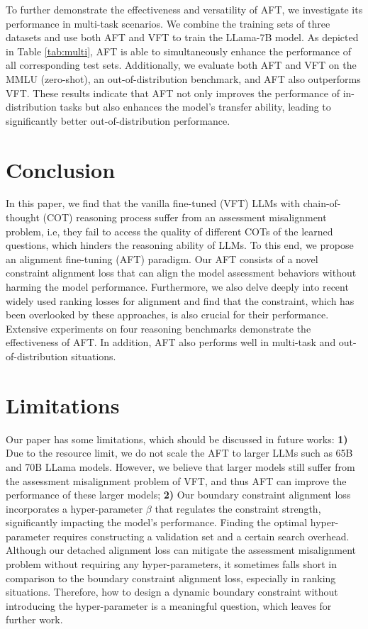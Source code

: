 To further demonstrate the effectiveness and versatility of AFT, we investigate its performance in multi-task scenarios. We combine the training sets of three datasets and use both AFT and VFT to train the LLama-7B model. As depicted in Table \ref{tab:multi}, AFT is able to simultaneously enhance the performance of all corresponding test sets. Additionally, we evaluate both AFT and VFT on the MMLU (zero-shot), an out-of-distribution benchmark, and AFT also outperforms VFT. These results indicate that AFT not only improves the performance of in-distribution tasks but also enhances the model's transfer ability, leading to significantly better out-of-distribution performance.

\section{Conclusion}
In this paper, we find that the vanilla fine-tuned (VFT) LLMs with chain-of-thought (COT) reasoning process suffer from an assessment misalignment problem, i.e, they fail to access the quality of different COTs of the learned questions, which hinders the reasoning ability of LLMs. To this end, we propose an alignment fine-tuning (AFT) paradigm. Our AFT consists of a novel constraint alignment loss that can align the model assessment behaviors without harming the model performance. Furthermore, we also delve deeply into recent widely used ranking losses for alignment and find that the constraint, which has been overlooked by these approaches, is also crucial for their performance. Extensive experiments on four reasoning benchmarks demonstrate the effectiveness of AFT. In addition, AFT also performs well in multi-task and out-of-distribution situations.

\section{Limitations}
Our paper has some limitations, which should be discussed in future works:
\textbf{1)} Due to the resource limit, we do not scale the AFT to larger LLMs such as 65B and 70B LLama models. However, we believe that larger models still suffer from the assessment misalignment problem of VFT, and thus AFT can improve the performance of these larger models;
\textbf{2)} Our boundary constraint alignment loss incorporates a hyper-parameter $\beta$ that regulates the constraint strength, significantly impacting the model's performance. Finding the optimal hyper-parameter requires constructing a validation set and a certain search overhead. Although our detached alignment loss can mitigate the assessment misalignment problem without requiring any hyper-parameters, it sometimes falls short in comparison to the boundary constraint alignment loss, especially in ranking situations. Therefore, how to design a dynamic boundary constraint without introducing the hyper-parameter is a meaningful question, which leaves for further work.


